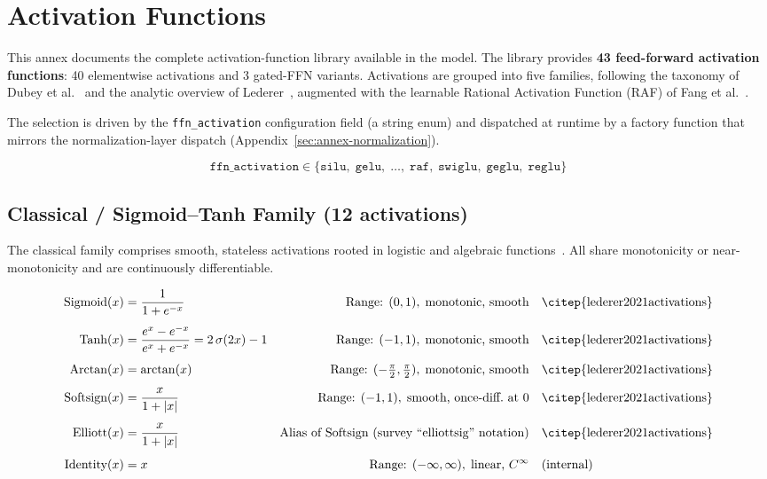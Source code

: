 \section{Activation Functions}
\label{sec:annex-activation-functions}

This annex documents the complete activation-function library available in the
model. The library provides \textbf{43 feed-forward activation functions}: 40
elementwise activations and 3 gated-FFN variants. Activations are grouped into
five families, following the taxonomy of Dubey et al.~\citep{dubey2021activations}
and the analytic overview of Lederer~\citep{lederer2021activations}, augmented
with the learnable Rational Activation Function (RAF) of
Fang et al.~\citep{fang2023raft}.

The selection is driven by the \texttt{ffn\_activation} configuration field (a
string enum) and dispatched at runtime by a factory function that mirrors the
normalization-layer dispatch (Appendix~\ref{sec:annex-normalization}).

\[
\texttt{ffn\_activation} \in \{\texttt{silu},\;\texttt{gelu},\;\dots,\;
\texttt{raf},\;\texttt{swiglu},\;\texttt{geglu},\;\texttt{reglu}\}
\]

\subsection{Classical / Sigmoid--Tanh Family (12 activations)}

The classical family comprises smooth, stateless activations rooted in
logistic and algebraic functions~\citep{lederer2021activations,dubey2021activations}.
All share monotonicity or near-monotonicity and are continuously differentiable.

{\footnotesize
\begin{align}
  \text{Sigmoid}(x) &= \frac{1}{1+e^{-x}}
    & \text{Range: } (0,1),\;\text{monotonic, smooth}
    & \quad \text{\citep{lederer2021activations}} \\[4pt]
  \text{Tanh}(x) &= \frac{e^{x}-e^{-x}}{e^{x}+e^{-x}} = 2\,\sigma(2x)-1
    & \text{Range: } (-1,1),\;\text{monotonic, smooth}
    & \quad \text{\citep{lederer2021activations}} \\[4pt]
  \text{Arctan}(x) &= \arctan(x)
    & \text{Range: } (-\tfrac{\pi}{2},\tfrac{\pi}{2}),\;\text{monotonic, smooth}
    & \quad \text{\citep{lederer2021activations}} \\[4pt]
  \text{Softsign}(x) &= \frac{x}{1+|x|}
    & \text{Range: } (-1,1),\;\text{smooth, once-diff.\ at 0}
    & \quad \text{\citep{lederer2021activations}} \\[4pt]
  \text{Elliott}(x) &= \frac{x}{1+|x|}
    & \text{Alias of Softsign (survey ``elliottsig'' notation)}
    & \quad \text{\citep{lederer2021activations}} \\[4pt]
  \text{Identity}(x) &= x
    & \text{Range: } (-\infty,\infty),\;\text{linear, }C^\infty
    & \quad \text{(internal)}
\end{align}
}  %


